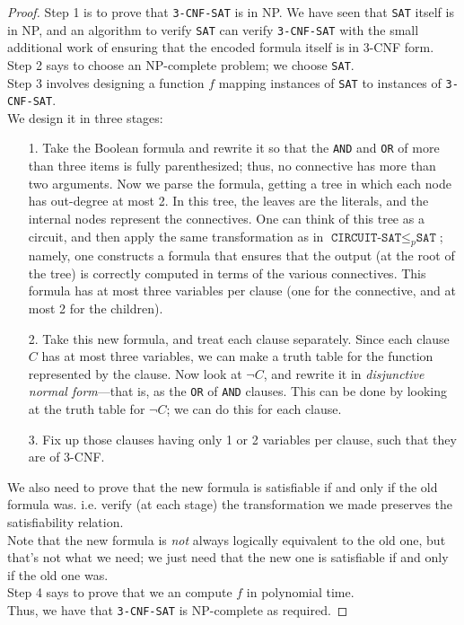\documentclass[12pt]{article}
\theoremstyle{plain}
\theoremstyle{definition}
\begin{document}
\begin{proof}
Step 1 is to prove that \texttt{3-CNF-SAT} is in NP.
We have seen that \texttt{SAT} itself is in NP, and an algorithm to verify \texttt{SAT} can verify \texttt{3-CNF-SAT} with the small additional work of ensuring that the encoded formula itself is in 3-CNF form. \\

Step 2 says to choose an NP-complete problem;
we choose \texttt{SAT}. \\

Step 3 involves designing a function $f$ mapping instances of \texttt{SAT} to instances of \texttt{3-CNF-SAT}. \\
We design it in three stages:
\begin{enumerate}
  \item[1.] Take the Boolean formula and rewrite it so that the \texttt{AND} and \texttt{OR} of more than three items is fully parenthesized;
  thus, no connective has more than two arguments.
  Now we parse the formula, getting a tree in which each node has out-degree at most 2.
  In this tree, the leaves are the literals, and the internal nodes represent the connectives.
  One can think of this tree as a circuit, and then apply the same transformation as in $\texttt{CIRCUIT-SAT} \leq_{p} \texttt{SAT}$;
  namely, one constructs a formula that ensures that the output (at the root of the tree) is correctly computed in terms of the various connectives.
  This formula has at most three variables per clause (one for the connective, and at most 2 for the children). \medskip

  \item[2.] Take this new formula, and treat each clause separately.
  Since each clause $C$ has at most three variables, we can make a truth table for the function represented by the clause.
  Now look at $\neg C$, and rewrite it in \emph{disjunctive normal form}---that is, as the \texttt{OR} of \texttt{AND} clauses.
  This can be done by looking at the truth table for $\neg C$;
  we can do this for each clause. \medskip

  \item[3.] Fix up those clauses having only 1 or 2 variables per clause, such that they are of 3-CNF. \medskip
\end{enumerate}
We also need to prove that the new formula is satisfiable if and only if the old formula was.
i.e. verify (at each stage) the transformation we made preserves the satisfiability relation. \\
Note that the new formula is \emph{not} always logically equivalent to the old one, but that's not what we need;
we just need that the new one is satisfiable if and only if the old one was. \\

Step 4 says to prove that we an compute $f$ in polynomial time. \\

Thus, we have that \texttt{3-CNF-SAT} is NP-complete as required.
\end{proof}
\end{document}
